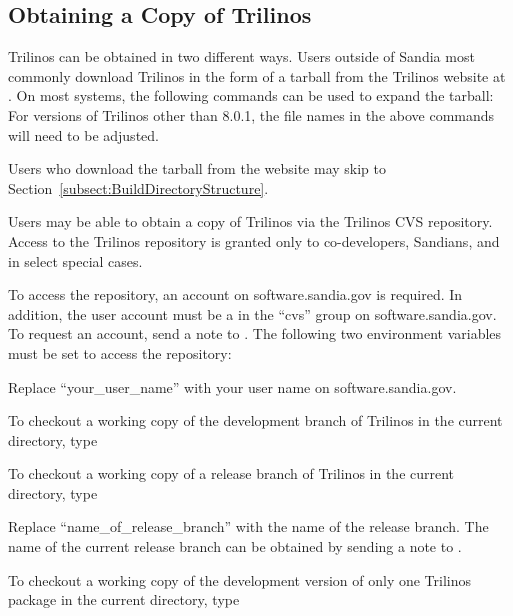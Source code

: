 \documentclass[12pt,relax]{TrilinosUserGuide}
\begin{document}
\subsection{Obtaining a Copy of Trilinos}

Trilinos can be obtained in two different ways.  Users outside of Sandia
most commonly
download Trilinos in the form of a tarball from the Trilinos website at
\newline {}.
On most systems, the following commands can be used to expand the tarball:
For versions of Trilinos other than 8.0.1, the file names in the above
commands will need to be adjusted.

Users who download the tarball from the website may skip to
Section~\ref{subsect:BuildDirectoryStructure}.

Users may be able to obtain a
copy of Trilinos via the Trilinos CVS repository.  Access to the Trilinos
repository is granted only to co-developers, Sandians, and in select
special cases.

To access the repository, an account on software.sandia.gov is required.  In
addition, the user account must be a in the ``cvs'' group
on software.sandia.gov.  To request an account, send a note
to .
The following two environment variables must be set to access the repository:


Replace ``your\_user\_name'' with your user name on software.sandia.gov.

To checkout a working copy of the development branch of Trilinos in the
current directory, type


To checkout a working copy of a release branch of Trilinos in the current
directory, type


Replace ``name\_of\_release\_branch'' with the name of the release branch.
The name of the current release branch can be obtained by sending a note to
\newline {}.

To checkout a working copy of the development version of only one Trilinos
package in the current directory, type
\end{document}
